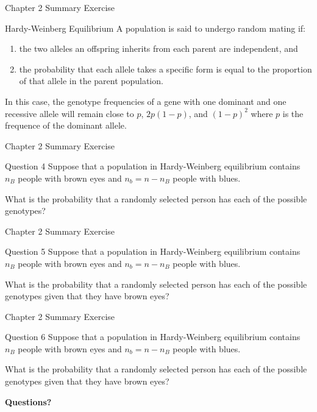 \documentclass[aspectratio=169,xcolor=pdftex,dvipsnames,table]{beamer}\usepackage[]{graphicx}\usepackage[]{xcolor}
\begin{document}
\begin{frame}{Chapter 2 Summary Exercise}

  \begin{block}{Hardy-Weinberg Equilibrium}
  A population is said to undergo random mating if:
  
  \begin{enumerate}[1)]
  \item the two alleles an offspring inherits from each parent are independent, and
  \item the probability that each allele takes a specific form is equal to the proportion of that allele in the parent population.
  \end{enumerate}
  \end{block}
  
  \medskip
  
  In this case, the genotype frequencies of a gene with one dominant and one recessive allele will remain close to $p$, $2p(1-p)$, and $(1-p)^2$ where $p$ is the frequence of the dominant allele.
\end{frame}

\begin{frame}{Chapter 2 Summary Exercise}

\begin{block}{Question 4}
Suppose that a population in Hardy-Weinberg equilibrium contains $n_B$ people with brown eyes and $n_b=n-n_B$ people with blues. 

\medskip

What is the probability that a randomly selected person has each of the possible genotypes?
\end{block}
\end{frame}

\begin{frame}{Chapter 2 Summary Exercise}

\begin{block}{Question 5}
Suppose that a population in Hardy-Weinberg equilibrium contains $n_B$ people with brown eyes and $n_b=n-n_B$ people with blues. 

\medskip

What is the probability that a randomly selected person has each of the possible genotypes given that they have brown eyes?
\end{block}
\end{frame}

\begin{frame}{Chapter 2 Summary Exercise}

\begin{block}{Question 6}
Suppose that a population in Hardy-Weinberg equilibrium contains $n_B$ people with brown eyes and $n_b=n-n_B$ people with blues. 

\medskip

What is the probability that a randomly selected person has each of the possible genotypes given that they have brown eyes?
\end{block}
\end{frame}

\begin{frame}
  \begin{center}
    \Large{\textbf{Questions?}}
  \end{center}
\end{frame}
\end{document}
